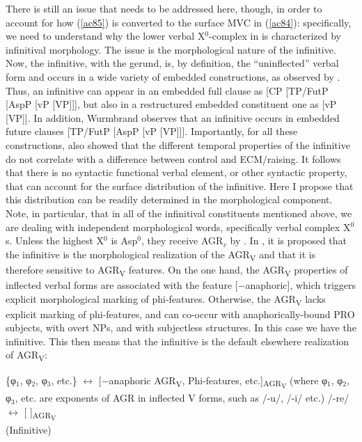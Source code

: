 \documentclass[output=paper]{langscibook}
\begin{document}
There is still an issue that needs to be addressed here, though, in order to account for how (\ref{ac85}) is converted to the surface MVC in (\ref{ac84}): specifically, we need to understand why the lower verbal X$^0$-complex in  is characterized by infinitival morphology. The issue is the morphological nature of the infinitive. Now, the infinitive, with the gerund, is, by definition, the “uninflected” verbal form and occurs in a wide variety of embedded constructions, as observed by \citet{wurmbrand2014a}.  Thus, an infinitive can appear in an embedded full clause as [CP [TP/FutP [AspP [vP [VP]]], but also in a restructured embedded constituent one as [vP [VP]].  In addition, Wurmbrand observes that an infinitive occurs in embedded future clauses  [TP/FutP [AspP [vP [VP]]]. Importantly, for all these constructions, \citet{wurmbrand2014a} also showed that the different temporal properties of the infinitive do not correlate with a difference between control and ECM/raising. It follows that there is no syntactic functional verbal element, or other syntactic property, that can account for the surface distribution of the infinitive. Here I propose that this distribution can be readily determined in the morphological component. Note, in particular, that in all of the infinitival constituents mentioned above, we are dealing with independent morphological words, specifically verbal complex X$^0$s.  Unless the highest X$^0$ is Asp$^0$, they receive AGR$_v$ by . In \citet{calabrese1993a}, it is proposed that the infinitive is the morphological realization of the  AGR\textsubscript{V} and that it is therefore sensitive to  AGR\textsubscript{V} features. On the one hand, the  AGR\textsubscript{V} properties of inflected verbal forms are associated with the feature [−anaphoric], which triggers explicit morphological marking of phi-features.  Otherwise, the  AGR\textsubscript{V} lacks explicit marking of phi-features, and can co-occur with anaphorically-bound PRO subjects, with overt NPs, and with subjectless structures. In this case we have the infinitive. This then means that the infinitive is the default elsewhere realization of AGR\textsubscript{V}:

\ea\label{ac89}
    \ea \label{ac89a}\{φ$_1$, φ$_2$, φ$_3$, etc.\} $\longleftrightarrow$ [−anaphoric  AGR\textsubscript{V}, Phi-features, etc.]\textsubscript{AGR\textsubscript{V}}
       (where φ$_1$, φ$_2$, φ$_3$, etc. are exponents of AGR in inflected V forms, such as /-u/, /-i/ etc.)
    \ex \label{ac89b}/-re/ $\longleftrightarrow$  [   ]\textsubscript{AGR\textsubscript{V}}\\(Infinitive)
    \z
\z
\end{document}
